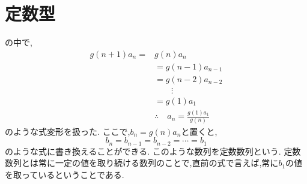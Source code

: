 
\section{定数型}\label{節：定数数列}
  の中で,
  \begin{align*}
    g(n+1)a_{n}=&g(n)a_n\\
    &=g(n-1)a_{n-1}\\
    &=g(n-2)a_{n-2}\\
    &\qquad \vdots\\
    &=g(1)a_1\\
    &\therefore \quad a_n=\frac{g(1)a_1}{g(n)}
  \end{align*}
  のような式変形を扱った.
  ここで,$\displaystyle b_n=g(n)a_n$と置くと,
  \[
    b_n=b_{n-1}=b_{n-2}=\cdots=b_1
  \]
  のような式に書き換えることができる.
  このような数列を定数数列という.
  定数数列とは常に一定の値を取り続ける数列のことで,直前の式で言えば,常に$b_1$の値を取っているということである.
  
